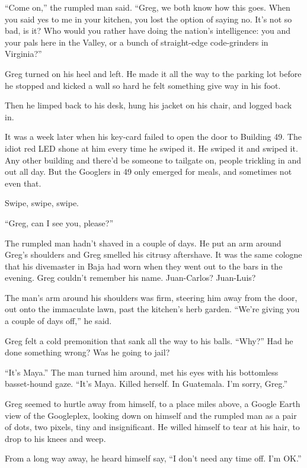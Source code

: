 “Come on,” the rumpled man said. “Greg, we both know how this 
goes. When you said yes to me in your kitchen, you lost the option of 
saying no. It's not so bad, is it? Who would you rather have doing the 
nation's intelligence: you and your pals here in the Valley, or a bunch 
of straight-edge code-grinders in Virginia?”

Greg turned on his heel and left. He made it all the way to the parking 
lot before he stopped and kicked a wall so hard he felt something give 
way in his foot.

Then he limped back to his desk, hung his jacket on his chair, and 
logged back in.

\tb

It was a week later when his key-card failed to open the door to 
Building 49. The idiot red LED shone at him every time he swiped it. He 
swiped it and swiped it. Any other building and there'd be someone to 
tailgate on, people trickling in and out all day. But the Googlers in 
49 only emerged for meals, and sometimes not even that.

Swipe, swipe, swipe.

“Greg, can I see you, please?”

The rumpled man hadn't shaved in a couple of days. He put an arm around 
Greg's shoulders and Greg smelled his citrusy aftershave. It was the 
same cologne that his divemaster in Baja had worn when they went out to 
the bars in the evening. Greg couldn't remember his name. Juan-Carlos? 
Juan-Luis?

The man's arm around his shoulders was firm, steering him away from the 
door, out onto the immaculate lawn, past the kitchen's herb garden. 
“We're giving you a couple of days off,” he said.

Greg felt a cold premonition that sank all the way to his balls. 
“Why?” Had he done something wrong? Was he going to jail?

“It's Maya.” The man turned him around, met his eyes with his 
bottomless basset-hound gaze. “It's Maya. Killed herself. In 
Guatemala. I'm sorry, Greg.”

Greg seemed to hurtle away from himself, to a place miles above, a 
Google Earth view of the Googleplex, looking down on himself and the 
rumpled man as a pair of dots, two pixels, tiny and insignificant. He 
willed himself to tear at his hair, to drop to his knees and weep.

From a long way away, he heard himself say, “I don't need any time 
off. I'm OK.”

